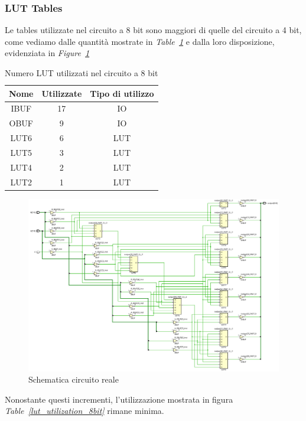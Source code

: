 \subsubsection{LUT Tables}
Le tables utilizzate nel circuito a 8 bit sono maggiori di quelle del circuito a 4 bit, come vediamo dalle quantità mostrate in \textit{Table~\ref{lut_quantity_8bit}} e dalla loro disposizione,
evidenziata in \textit{Figure~\ref{lut_schematic_8bit}}
\begin{table}[ht]
      \centering
      \begin{tabular}{|c|c|c|}
        \hline
        Nome & Utilizzate & Tipo di utilizzo \\ \hline
        IBUF & 17 & IO \\ \hline
        OBUF & 9 & IO \\ \hline
        LUT6 & 6 & LUT \\ \hline
        LUT5 & 3 & LUT \\ \hline
        LUT4 & 2 & LUT \\ \hline
        LUT2 & 1 & LUT \\ \hline 
      \end{tabular}
      \caption{Numero LUT utilizzati nel circuito a 8 bit}
      \label{lut_quantity_8bit}
\end{table}
\begin{figure}[ht]
  \centering
  \includegraphics[width=1\textwidth]{assets/LUT/8bit/LUT_schematic_8bit.png}
  \caption{Schematica circuito reale}
  \label{lut_schematic_8bit}
\end{figure}

Nonostante questi incrementi, l'utilizzazione mostrata in figura \textit{Table~\ref{lut_utilization_8bit}} rimane minima.

